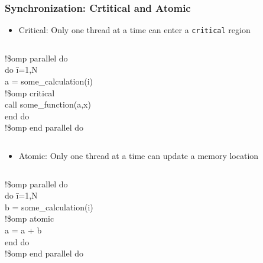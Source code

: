 \documentclass[slidestop,mathserif,compress,xcolor=svgnames]{beamer}
\newenvironment{eblock}[0]
{
\begin{beamerboxesrounded}[upper=uppercol2,lower=lowercol2,shadow=true]}
{\end{beamerboxesrounded}}
\begin{document}
\begin{frame}
  \frametitle{\small Synchronization: Crtitical and Atomic}
  \begin{itemize}
    \item Critical: Only one thread at a time can enter a \texttt{critical} region 
  \end{itemize}
  \begin{columns}
    \column{5cm}
    \begin{eblock}{}
      \begin{tabbing}
        !\$omp parallel do \\
        do \=i=1,N \\
        \> a = some\_calculation(i) \\
        \>!\$omp critical \\
        \>call some\_function(a,x) \\
        end do \\
        !\$omp end parallel do 
      \end{tabbing}
    \end{eblock}
  \end{columns}
  \begin{itemize}
    \item Atomic: Only one thread at a time can update a memory location 
  \end{itemize}
  \begin{columns}
    \column{5cm}
    \begin{eblock}{}
      \begin{tabbing}
        !\$omp parallel do \\
        do \=i=1,N \\
        \> b = some\_calculation(i) \\
        \>!\$omp atomic \\
        \> a = a + b \\ 
        end do \\
        !\$omp end parallel do
      \end{tabbing}
    \end{eblock}  
  \end{columns}
\end{frame}
\end{document}

